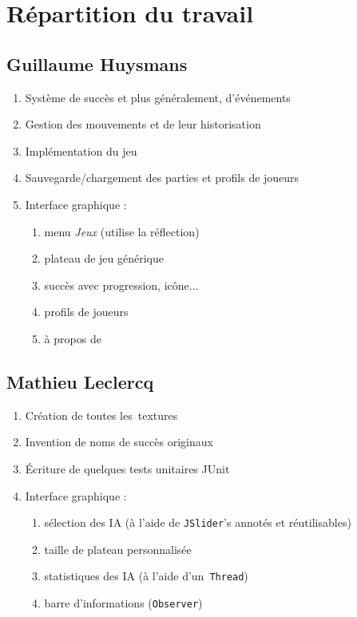 \section{Répartition du travail}

\subsection{Guillaume Huysmans}
\begin{enumerate}
	\item Système de succès et plus généralement, d'événements
    \item Gestion des mouvements et de leur historisation
    \item Implémentation du jeu \oth
    \item Sauvegarde/chargement des parties et profils de joueurs
    \item Interface graphique :
    \begin{enumerate}
        \item menu \textit{Jeux} (utilise la réflection)
        \item plateau de jeu générique
        \item succès avec progression, icône...
        \item profils de joueurs
        \item à propos de
    \end{enumerate}
\end{enumerate}

\subsection{Mathieu Leclercq}
\begin{enumerate}
	\item Création de toutes les~textures
    \item Invention de noms de succès originaux
    \item Écriture de quelques tests unitaires JUnit
    \item Interface graphique : 
    \begin{enumerate}
        \item sélection des IA (à l'aide de \texttt{JSlider}'s annotés et réutilisables)
        \item taille de plateau personnalisée
        \item statistiques des IA (à l'aide d'un~\texttt{Thread})
        \item barre d'informations (\texttt{Observer})
    \end{enumerate}
\end{enumerate}

